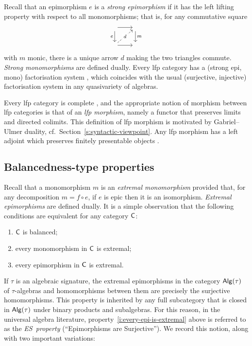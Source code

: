 \documentclass[a4paper,10pt,reqno]{amsart}
\theoremstyle{definition}
\theoremstyle{remark}
\newcommand{\cat}{{\sf C}}								%
\newcommand{\Alg}[1]{\sf{Alg}(#1)}							%
\newcommand{\ES}{\textnormal{ES}}
\begin{document}
Recall that an epimorphism $e$ is a \emph{strong epimorphism} if it has the left lifting property with respect to all monomorphisms; that is, for any commutative square
\[\begin{tikzcd}[cells={nodes={inner sep=2pt, outer sep=1pt}}]
\phantom{\cdot} \arrow{r} \arrow{d}[swap]{e} & \phantom{\cdot} \arrow{d}{m} \\
\phantom{\cdot} \arrow{r} \arrow[dashed]{ur}[description]{d} & \phantom{\cdot}
\end{tikzcd}\]
with $m$ monic, there is a unique arrow $d$ making the two triangles commute. \emph{Strong monomorphisms} are defined dually. Every lfp category has a (strong epi, mono) factorisation system \cite[Proposition~1.61]{ar94book}, which coincides with the usual (surjective, injective) factorisation system in any quasivariety of algebras.

Every lfp category is complete \cite[Corollary~1.28]{ar94book}, and the appropriate notion of morphism between lfp categories is that of an \emph{lfp morphism}, namely a functor that preserves limits and directed colimits. This definition of lfp morphism is motivated by Gabriel--Ulmer duality, cf.\ Section~\ref{s:syntactic-viewpoint}. Any lfp morphism has a left adjoint which preserves finitely presentable objects \cite[Theorem~1.66]{ar94book}.

\subsection{Balancedness-type properties}\label{s:definability-props}
%
Recall that a monomorphism $m$ is an \emph{extremal monomorphism} provided that, for any decomposition $m= f\circ e$, if $e$ is epic then it is an isomorphism. \emph{Extremal epimorphisms} are defined dually. 
%
It is a simple observation that the following conditions are equivalent for any category $\cat$:
\begin{enumerate}[label=(\arabic*)]
\item $\cat$ is balanced;
\item every monomorphism in $\cat$ is extremal;
\item\label{i:every-epi-is-extremal} every epimorphism in $\cat$ is extremal.
\end{enumerate}

If $\tau$ is an algebraic signature, the extremal epimorphisms in the category $\Alg{\tau}$ of $\tau$-algebras and homomorphisms between them are precisely the surjective homomorphisms. This property is inherited by any full subcategory that is closed in $\Alg{\tau}$ under binary products and subalgebras.
%
For this reason, in the universal algebra literature, property~\ref{i:every-epi-is-extremal} above is referred to as the \emph{\ES~property} (``Epimorphisms are Surjective'').
%
We record this notion, along with two important variations:
\end{document}
